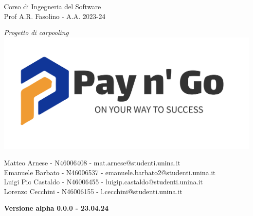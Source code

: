 \begin{titlepage}
\centering


\vspace{2cm}
{\Large Corso di Ingegneria del Software}
\\
{\Large Prof A.R. Fasolino - A.A. 2023-24}

\vspace{1cm}
\Large\textit{Progetto di carpooling}
\\
\includegraphics[width=0.5\linewidth]{img//logo/payngo-logo.png}

\vspace{1cm}

\large{Matteo Arnese - N46006408 - mat.arnese@studenti.unina.it}
\\
\large{Emanuele Barbato - N46006537 - emanuele.barbato2@studenti.unina.it}
\\
\large{Luigi Pio Castaldo - N46006455 - luigip.castaldo@studenti.unina.it}
\\
\large{Lorenzo Cecchini - N46006155 - l.cecchini@studenti.unina.it}

\vfill

{\bfseries Versione alpha 0.0.0 - 23.04.24}

\end{titlepage}
